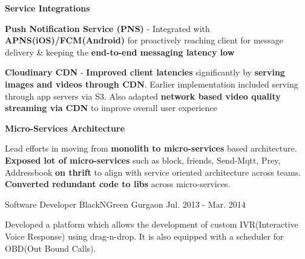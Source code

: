\begin{cventries}
{\begin{cvitems}
		\item {\textbf{Service Integrations}}
        \begin{cventries}
          \cventry
            {} %
            {} %
            {} %
            {} %
            {
             \vspace{-20pt}
              \begin{cvsubitems}
                \item {\textbf{Push Notification Service (PNS)} - Integrated with \textbf{APNS(iOS)/FCM(Android)} for proactively reaching client for message delivery \& keeping the \textbf{end-to-end messaging latency low}}
        		\item {\textbf{Cloudinary CDN} - \textbf{Improved client latencies} significantly by \textbf{serving images and videos through CDN}. Earlier implementation included serving through app servers via S3. Also adapted \textbf{network based video quality streaming via CDN} to improve overall user experience}
              \end{cvsubitems}
            }
        \end{cventries}
		\item {\textbf{Micro-Services Architecture}}
        \begin{cventries}
          \cventry
            {} %
            {} %
            {} %
            {} %
            {
             \vspace{-20pt}
              \begin{cvsubitems}
		        \item {Lead efforts in moving from \textbf{monolith to micro-services} based architecture. \textbf{Exposed lot of micro-services} such as block, friends, Send-Mqtt, Prey, Addressbook \textbf{on thrift} to align with service oriented architecture across teams. \textbf{Converted redundant code to libs} across micro-services.}
              \end{cvsubitems}
            }
        \end{cventries}
      \end{cvitems}
      \vspace{6pt}
    }
%    
  \cventry
    {Software Developer} %
    {BlackNGreen} %
    {Gurgaon} %
    {Jul. 2013 - Mar. 2014} %
    {
     \vspace{3pt}
      \begin{cvitems} %
        \item {Developed a platform which allows the development of custom IVR(Interactive Voice Response) using drag-n-drop. It is also equipped with a scheduler for OBD(Out Bound Calls).}
      \end{cvitems}
    }
\end{cventries}
